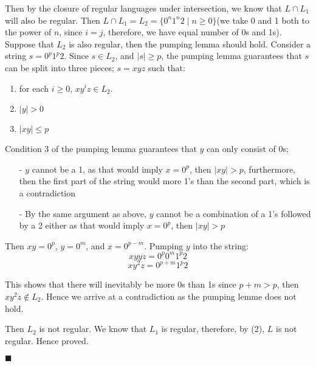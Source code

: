 \documentclass[addpoints]{exam}
\begin{document}
\begin{questions}
\begin{solution}
\begin{parts}
      Then by the closure of regular languages under intersection, we know that $ L \cap L_1 $ will also be regular. Then $ L \cap L_1 = L_2 = \{ 0^n1^n2 \mid n \geq 0 \} $(we take 0 and 1 both to the power of $n$, since $ i = j $, therefore, we have equal number of 0s and 1s). Suppose that $L_2$ is also regular, then the pumping lemma should hold. Consider a string $ s = 0^p1^p2 $. Since $ s \in L_2 $, and $ |s| \geq p $, the pumping lemma guarantees that $s$ can be split into three pieces; $ s = xyz $ such that:\vspace*{-2mm}
      \begin{enumerate}
        \item for each $ i \geq 0 $, $ xy^iz \in L_2 $. \vspace*{-1mm}
        \item $ |y| > 0 $ \vspace*{-1mm}
        \item $ |xy| \leq p $
      \end{enumerate}
      Condition 3 of the pumping lemma guarantees that $y$ can only consist of 0s; \vspace*{-2mm}
      \begin{itemize}
        \item[-] $y$ cannot be a 1, as that would imply $x = 0^p$, then $|xy| > p$, furthermore, then the first part of the string would  more 1's than the second part, which is a contradiction \vspace*{-1mm}
        \item[-] By the same argument as above, $y$ cannot be a combination of a 1's followed by a 2 either as that would imply $x = 0^p$, then $|xy| > p$
      \end{itemize}
      Then $ xy = 0^p $, $ y = 0^m $, and $ x = 0^{p - m} $. Pumping $y$ into the string:
      $$ xyyz = 0^p0^m1^p2 $$ $$ xy^2z = 0^{p + m}1^p2 $$

      This shows that there will inevitably be more 0s than 1s since $ p + m > p $, then $ xy^2z \notin L_2 $. Hence we arrive at a contradiction as the pumping lemme does not hold.

      Then $ L_2 $ is not regular. We know that $L_1$ is regular, therefore, by (2), $L$ is not regular. Hence proved. \vspace*{-2mm}
      \begin{flushright}
        $\blacksquare$
      \end{flushright}
    \end{parts}



  \end{solution}



\end{questions}
\end{document}
